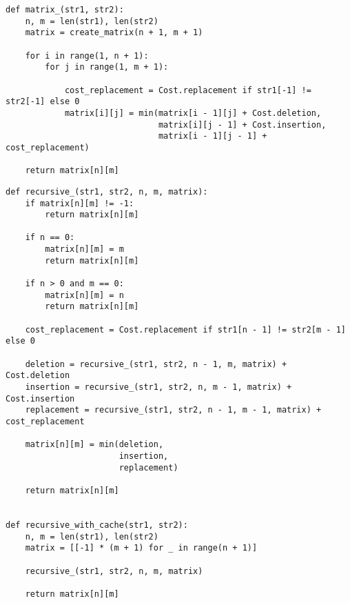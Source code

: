 \begin{center}
\captionsetup{justification=raggedright,singlelinecheck=off}
\begin{lstlisting}[label=lst:matrix,caption=Матричный алгоритм нахождения расстояния Левенштейна]
def matrix_(str1, str2):
    n, m = len(str1), len(str2)
    matrix = create_matrix(n + 1, m + 1)

    for i in range(1, n + 1):
        for j in range(1, m + 1):

            cost_replacement = Cost.replacement if str1[-1] != str2[-1] else 0
            matrix[i][j] = min(matrix[i - 1][j] + Cost.deletion,
                               matrix[i][j - 1] + Cost.insertion,
                               matrix[i - 1][j - 1] + cost_replacement)

    return matrix[n][m]
\end{lstlisting}
\end{center}
\clearpage
\begin{center}
\captionsetup{justification=raggedright,singlelinecheck=off}
\begin{lstlisting}[label=lst:cache,caption=Алгоритм нахождения расстояния Левенштейна с использованием матрицы]
def recursive_(str1, str2, n, m, matrix):
    if matrix[n][m] != -1:
        return matrix[n][m]

    if n == 0:
        matrix[n][m] = m
        return matrix[n][m]
    
    if n > 0 and m == 0:
        matrix[n][m] = n
        return matrix[n][m]

    cost_replacement = Cost.replacement if str1[n - 1] != str2[m - 1] else 0

    deletion = recursive_(str1, str2, n - 1, m, matrix) + Cost.deletion
    insertion = recursive_(str1, str2, n, m - 1, matrix) + Cost.insertion
    replacement = recursive_(str1, str2, n - 1, m - 1, matrix) + cost_replacement
    
    matrix[n][m] = min(deletion,
                       insertion,
                       replacement)

    return matrix[n][m]


def recursive_with_cache(str1, str2):
    n, m = len(str1), len(str2)
    matrix = [[-1] * (m + 1) for _ in range(n + 1)]

    recursive_(str1, str2, n, m, matrix)

    return matrix[n][m]
\end{lstlisting}
\end{center}
\clearpage
